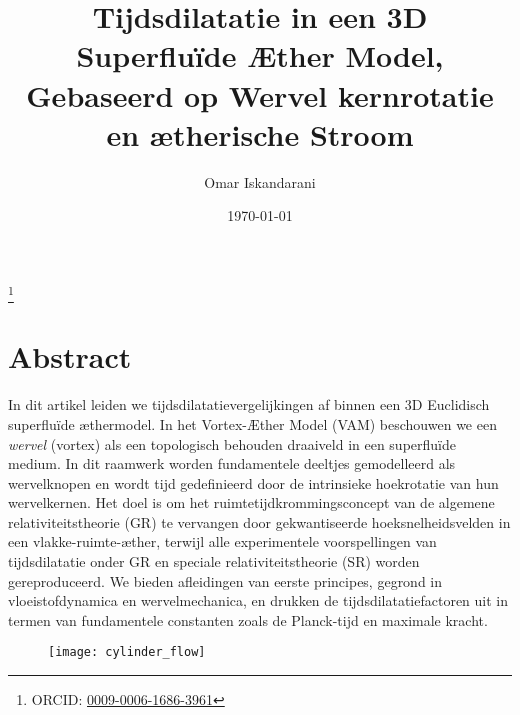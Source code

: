 \documentclass[a4paper,12pt]{revtex4}
\begin{document}
\author{Omar Iskandarani}
\title{Tijdsdilatatie in een 3D Superfluïde Æther Model, Gebaseerd op Wervel kernrotatie en ætherische Stroom}
\date{\today}
\thanks{ORCID: \href{https://orcid.org/0009-0006-1686-3961}{0009-0006-1686-3961}}

\maketitle

\section*{Abstract}
In dit artikel leiden we tijdsdilatatievergelijkingen af binnen een 3D Euclidisch superfluïde æthermodel. In het Vortex-Æther Model (VAM) beschouwen we een \textit{wervel} (vortex) als een topologisch behouden draaiveld in een superfluïde medium. In dit raamwerk worden fundamentele deeltjes gemodelleerd als wervelknopen en wordt tijd gedefinieerd door de intrinsieke hoekrotatie van hun wervelkernen. Het doel is om het ruimtetijdkrommingsconcept van de algemene relativiteitstheorie (GR) te vervangen door gekwantiseerde hoeksnelheidsvelden in een vlakke-ruimte-æther, terwijl alle experimentele voorspellingen van tijdsdilatatie onder GR en speciale relativiteitstheorie (SR) worden gereproduceerd. We bieden afleidingen van eerste principes, gegrond in vloeistofdynamica en wervelmechanica, en drukken de tijdsdilatatiefactoren uit in termen van fundamentele constanten zoals de Planck-tijd en maximale kracht.




\begin{figure}[htbp]
    \centering
    \texttt{[image: cylinder\_flow]}
    \caption{}
    \label{fig:cylinderflow}
\end{figure}
\end{document}
